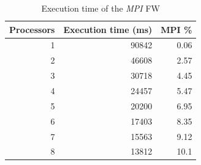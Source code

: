 \documentclass[compsoc]{IEEEtran}
\begin{document}
\begin{table}[h!]
\centering
\begin{tabular}{|r|r|r|}
\hline
\rowcolor[HTML]{F56B00} 
{\color[HTML]{FFFFFF} \textbf{Processors}} & {\color[HTML]{FFFFFF} \textbf{Execution time (ms)}} & {\color[HTML]{FFFFFF} \textbf{MPI \%}} \\ \hline
1                                          & 90842                                               & 0.06                                 \\ \hline
2                                          & 46608                                               & 2.57                                 \\ \hline
3                                          & 30718                                               & 4.45                                \\ \hline
4                                          & 24457                                               & 5.47                                \\ \hline
5                                          & 20200                                               & 6.95                                 \\ \hline
6                                          & 17403                                               & 8.35                                \\ \hline
7                                          & 15563                                               & 9.12                                 \\ \hline
8                                          & 13812                                               & 10.1                                \\ \hline
\end{tabular}
\caption{Execution time of the \emph{MPI} FW}                                                                                                                                            
\label{tab:mpi-time}
\end{table}
\end{document}
